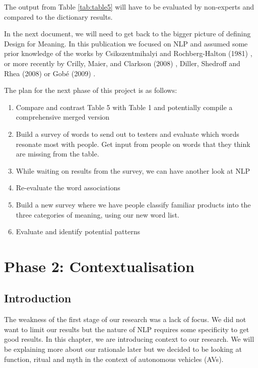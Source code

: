 \documentclass[12pt, usenames, dvipsnames]{report}
\begin{document}
\begin{flushleft}
The output from Table \ref{tab:table5} will have to be evaluated by non-experts and compared to the dictionary results.

In the next document, we will need to get back to the bigger picture of defining Design for Meaning.
In this publication we focused on NLP and assumed some prior knowledge of the works by Csikszentmihalyi and Rochberg-Halton (1981) \cite{csikszentmihalyi1981}, or more recently by Crilly, Maier, and Clarkson (2008) \cite{crilly2008}, Diller, Shedroff and Rhea (2008) \cite{diller2008} or Gobé (2009) \cite{gobe2009}.

The plan for the next phase of this project is as follows:

\begin{enumerate}
	\item Compare and contrast Table 5 with Table 1 and potentially compile a comprehensive merged version
	\item Build a survey of words to send out to testers and evaluate which words resonate most with people. Get input from people on words that they think are missing from the table.
	\item While waiting on results from the survey, we can have another look at NLP
	\item Re-evaluate the word associations
	\item Build a new survey where we have people classify familiar products into the three categories of meaning, using our new word list.
	\item Evaluate and identify potential patterns
\end{enumerate}


\chapter{Phase 2: Contextualisation}

\section*{Introduction}

The weakness of the first stage of our research was a lack of focus.
We did not want to limit our results but the nature of NLP requires some specificity to get good results.
In this chapter, we are introducing context to our research.
We will be explaining more about our rationale later but we decided to be looking at function, ritual and myth in the context of autonomous vehicles (AVs).


\end{flushleft}
\end{document}
